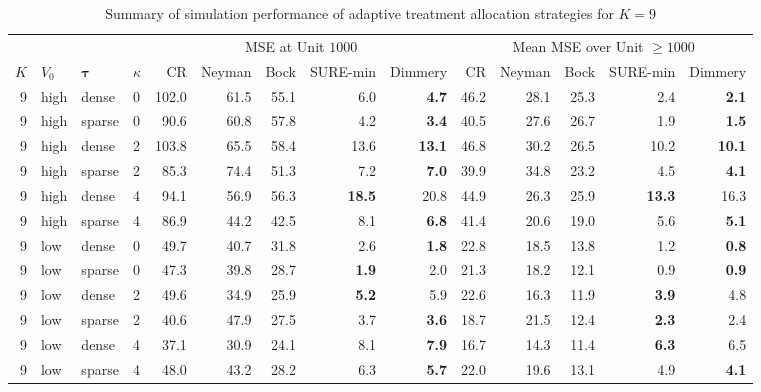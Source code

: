 \documentclass{article}
\newcommand{\bstau}{\boldsymbol \tau}
\begin{document}
\begin{table}[H]
\centering
\begin{threeparttable}
\caption{Summary of simulation performance of adaptive treatment allocation strategies for $K = 9$}
\label{tab:adaptiveSimsK9}

\small
\setlength{\tabcolsep}{4pt}

\begin{tabular}{rlll|rrrrr|rrrrr}
\toprule
 &  &  & 
& \multicolumn{5}{c}{MSE at Unit $1000$}
& \multicolumn{5}{c}{Mean MSE over Unit $\geq 1000$} \\
\cmidrule(lr){5-9} \cmidrule(lr){10-14}
$K$& $V_0$ & $\bstau$ & $\kappa$ & CR & Neyman & Bock & SURE-min & Dimmery
& CR & Neyman & Bock & SURE-min & Dimmery \\
\midrule
9 & high & dense & 0 & 102.0 & 61.5 & 55.1 & 6.0 & \textbf{4.7} & 46.2 & 28.1 & 25.3 & 2.4 & \textbf{2.1}\\
9 & high & sparse & 0 & 90.6 & 60.8 & 57.8 & 4.2 & \textbf{3.4} & 40.5 & 27.6 & 26.7 & 1.9 & \textbf{1.5}\\
9 & high & dense & 2 & 103.8 & 65.5 & 58.4 & 13.6 & \textbf{13.1} & 46.8 & 30.2 & 26.5 & 10.2 & \textbf{10.1}\\
9 & high & sparse & 2 & 85.3 & 74.4 & 51.3 & 7.2 & \textbf{7.0} & 39.9 & 34.8 & 23.2 & 4.5 & \textbf{4.1}\\
9 & high & dense & 4 & 94.1 & 56.9 & 56.3 & \textbf{18.5} & 20.8 & 44.9 & 26.3 & 25.9 & \textbf{13.3} & 16.3\\
9 & high & sparse & 4 & 86.9 & 44.2 & 42.5 & 8.1 & \textbf{6.8} & 41.4 & 20.6 & 19.0 & 5.6 & \textbf{5.1}\\
\midrule
9 & low & dense & 0 & 49.7 & 40.7 & 31.8 & 2.6 & \textbf{1.8} & 22.8 & 18.5 & 13.8 & 1.2 & \textbf{0.8}\\
9 & low & sparse & 0 & 47.3 & 39.8 & 28.7 & \textbf{1.9} & 2.0 & 21.3 & 18.2 & 12.1 & 0.9 & \textbf{0.9}\\
9 & low & dense & 2 & 49.6 & 34.9 & 25.9 & \textbf{5.2} & 5.9 & 22.6 & 16.3 & 11.9 & \textbf{3.9} & 4.8\\
9 & low & sparse & 2 & 40.6 & 47.9 & 27.5 & 3.7 & \textbf{3.6} & 18.7 & 21.5 & 12.4 & \textbf{2.3} & 2.4\\
9 & low & dense & 4 & 37.1 & 30.9 & 24.1 & 8.1 & \textbf{7.9} & 16.7 & 14.3 & 11.4 & \textbf{6.3} & 6.5\\
9 & low & sparse & 4 & 48.0 & 43.2 & 28.2 & 6.3 & \textbf{5.7} & 22.0 & 19.6 & 13.1 & 4.9 & \textbf{4.1}\\
\bottomrule
\end{tabular}
\end{threeparttable}
\end{table}
\end{document}
